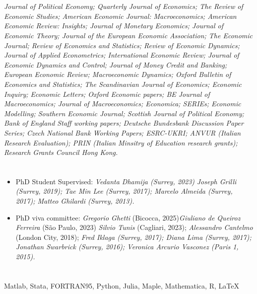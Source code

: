 \documentclass[margin, 11pt]{res} %
\begin{document}
\begin{resume}
\section{}
\emph{Journal of Political Economy; Quarterly Journal of Economics; The Review of Economic Studies; American Economic Journal: Macroeconomics; American Economic Review: Insights; Journal of Monetary Economics; Journal of Economic Theory; Journal of the European Economic Association; The Economic Journal; Review of Economics and Statistics; Review of Economic Dynamics; Journal of Applied Econometrics; International Economic Review; Journal of Economic Dynamics and Control; Journal of Money Credit and Banking; European Economic Review; Macroeconomic Dynamics; Oxford Bulletin of Economics and Statistics; The Scandinavian Journal of Economics; Economic Inquiry; Economic Letters; Oxford Economic papers; BE Journal of Macroeconomics; Journal of Macroeconomics; Economica; SERIEs; Economic Modelling; Southern Economic Journal; Scottish Journal of Political Economy; Bank of England Staff working papers; Deutsche Bundesbank Discussion Paper Series; Czech National Bank Working Papers; ESRC-UKRI; ANVUR (Italian Research Evaluation); PRIN (Italian Minsitry of Education research grants);  Research Grants Council Hong Kong.}


\section{}
\begin{itemize}
\item PhD Student Supervised: \emph{Vedanta Dhamija (Surrey, 2023)} \emph{Joseph Grilli (Surrey, 2019); Tae Min Lee (Surrey, 2017); Marcelo Almeida (Surrey, 2017); Matteo Ghilardi (Surrey, 2013).}
\item PhD viva committee: \emph{Gregorio Ghetti} (Bicocca, 2025)\emph{Giuliano de Queiroz Ferreira} (S\~ao Paulo, 2023) \emph{Silvio Tunis} (Cagliari, 2023); \emph{Alessandro Cantelmo} (London City, 2018); \emph{Fred Iklaga (Surrey, 2017); Diana Lima (Surrey, 2017); Jonathan Swarbrick (Surrey, 2016); Veronica Arcurio Vasconez (Paris 1, 2015).}
\end{itemize}


\section{}
Matlab, Stata, FORTRAN95, Python, Julia, Maple, Mathematica, R, \LaTeX\\


\end{resume}
\end{document}

